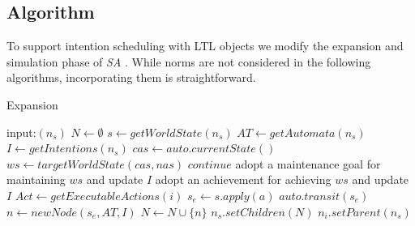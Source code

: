 \documentclass{article}
\newcommand{\SA}{\emph{SA} \hspace{1pt}}
\begin{document}
\subsection*{Algorithm}
To support intention scheduling with LTL objects we modify the expansion and simulation phase of \SA.
While norms are not considered in the following algorithms, incorporating them is straightforward.
\begin{algorithm}[H]
\caption{Expansion}\label{mg_expand}
\begin{algorithmic}[1]
\State input:$(n_s)$
      \State $N \gets \emptyset$
      \State $s \gets getWorldState(n_s)$
      \State $AT \gets getAutomata(n_s)$
      \State $I \gets getIntentions(n_s)$
        \State $cas \gets auto.currentState()$
          \State $ws \gets targetWorldState(cas, nas)$
            \State $continue$
          \EndIf
            \State adopt a maintenance goal for maintaining $ws$ and update $I$
          \Else
            \State adopt an achievement for achieving $ws$ and update $I$
          \EndIf
        \EndFor
      \EndFor
      \State $Act \gets getExecutableActions(i)$
        \State $s_e \gets s.apply(a)$
            \State $auto.transit(s_e)$
          \EndIf
        \EndFor
        \State $n \gets newNode(s_e, AT, I)$
        \State $N \gets N \cup \{n\}$
      \EndFor
    \EndFor
    \State $n_s.setChildren(N)$
    \State $n_i.setParent(n_s)$
    \EndFor
\end{algorithmic}
\end{algorithm}
\end{document}

